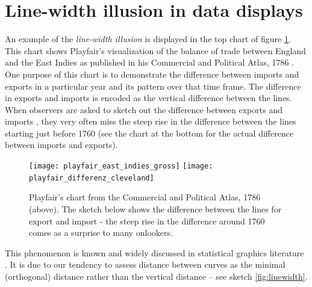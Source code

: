 %


\section{Line-width illusion in data displays}
An example of the  {\it line-width illusion} is displayed in %
the top chart of  figure  \ref{playfair}. 
This chart shows Playfair's  visualization of the balance of trade between England and the East Indies as published in his Commercial and Political Atlas, 1786 \cite{playfair, playfair2}. One purpose of this chart is to demonstrate the difference between imports and exports in a particular year and its pattern over that time frame. The difference in exports and imports is encoded as the vertical difference between the lines. When observers are asked to sketch out the difference between exports and imports  \citep{cleveland:1984}, they very often  miss the steep rise in the difference between the lines starting just before 1760 (see the chart at the bottom for the actual difference between imports and exports).


\begin{figure}
\texttt{[image: playfair\_east\_indies\_gross]}
\texttt{[image: playfair\_differenz\_cleveland]}
\caption{\label{playfair}
Playfair's chart from the Commercial and Political Atlas, 1786 (above). The sketch below shows  the difference between the lines for export and import - the steep rise in the difference around 1760  comes as a surprise to many onlookers.  }
\end{figure}


This phenomenon  is known and widely discussed in statistical graphics literature \citep{wainer:2000, robbins:2005}. It  is due to our  tendency to assess distance between curves as the minimal (orthogonal) distance rather than the  vertical distance -- see sketch \ref{fig:linewidth}.



